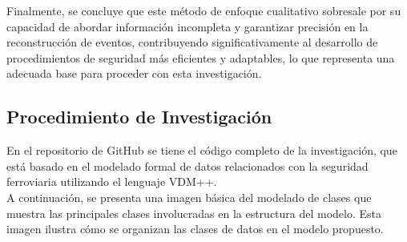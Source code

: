 \documentclass[journal]{IEEEtran}
\begin{document}
Finalmente, se concluye que este método de enfoque cualitativo sobresale por su capacidad de abordar información incompleta y garantizar precisión en la reconstrucción de eventos, contribuyendo significativamente al desarrollo de procedimientos de seguridad más eficientes y adaptables, lo que representa una adecuada base para proceder con esta investigación.  

\subsection*{Procedimiento de Investigación}  
En el repositorio de GitHub se tiene el código completo de la investigación, que está basado en el modelado formal de datos relacionados con la seguridad ferroviaria utilizando el lenguaje VDM++.\cite{DACS-SLL_Methods}\\
A continuación, se presenta una imagen básica del modelado de clases que muestra las principales clases involucradas en la estructura del modelo. Esta imagen ilustra cómo se organizan las clases de datos en el modelo propuesto.  


\sloppy
\end{document}
